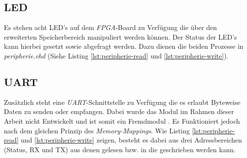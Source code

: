         
        
        

        \subsection{LED}
            Es stehen acht LED's auf dem \textit{FPGA}-Board zu Verfügung die über den erweiterten Speicherbereich
            manipuliert werden können. Der Status der LED's kann hierbei gesetzt sowie abgefragt werden.
            Dazu dienen die beiden Prozesse in \textit{peripherie.vhd} (Siehe Listing \ref{lst:peripherie-read} und \ref{lst:peripherie-write}).

        \subsection{UART}
            Zusätzlich steht eine \textit{UART}-Schnittstelle zu Verfügung die es erlaubt Byteweise Daten
            zu senden oder empfangen.
            Dabei wurde das Modul im Rahmen dieser Arbeit nicht Entwickelt und ist somit ein Fremdmodul \cite{vhdl-uart}.
            Es Funktioniert jedoch nach dem gleichen Prinzip des \textit{Memory-Mappings}.
            Wie Listing \ref{lst:peripherie-read} und \ref{lst:peripherie-write} zeigen,
            besteht es dabei aus drei Adressbereichen (Status, RX und TX) aus denen gelesen bzw. in die geschrieben werden kann.
            

